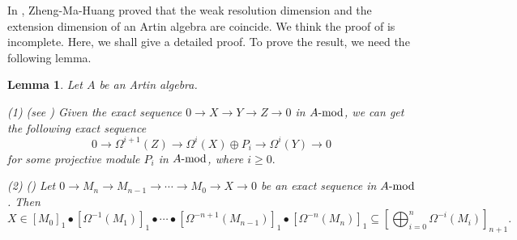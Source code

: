 \documentclass[12pt]{article}
\numberwithin{equation}{section}
\newtheorem{Lem}[Def]{Lemma}
\theoremstyle{definition}
\newcommand{\modcat}{\ensuremath{\mbox{{\rm -mod}}}}
\newcommand{\lra}{\longrightarrow}
\newcommand{\ra}{\rightarrow}
\begin{document}
\medskip
In \cite{zheng2020}, Zheng-Ma-Huang proved that the weak resolution dimension and the extension dimension of an Artin algebra are coincide. We think the proof of \cite[Theorem 3.5]{zheng2020} is incomplete. Here, we shall give a detailed proof. To prove the result, we need the following lemma.

\begin{Lem}\label{wrd-lem} Let $A$ be an Artin algebra.

{\rm (1) (see \cite[Lemma 4.6]{zheng22})} Given the exact sequence $0 \ra X\ra Y\ra Z\ra 0$
in $A\modcat$, we can get the following exact sequence
$$0 \lra \Omega^{i+1}(Z) \lra \Omega^{i}(X)\oplus P_{i}\lra \Omega^{i}(Y)\lra 0$$
for some projective module $P_{i}$ in $A\modcat$, where $i\ge 0.$

{\rm (2) (\cite[Lemma 3.5]{zh22})} Let $0\ra M_{n}\ra M_{n-1}\ra \cdots\ra M_0\ra X\ra 0$ be an exact sequence in $A\modcat$. Then
$$X\in [M_0]_1\bullet[\Omega^{-1}(M_{1})]_1
\bullet\cdots\bullet
[\Omega^{-n+1}(M_{n-1})]_1\bullet [\Omega^{-n}(M_n)]_1
\subseteq [\bigoplus_{i=0}^n\Omega^{-i}(M_i)]_{n+1}.$$
\end{Lem}
\end{document}
